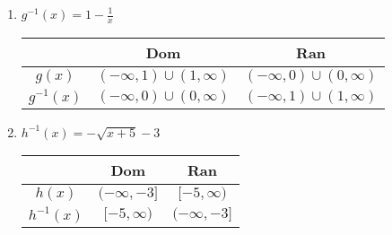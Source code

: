 \begin{enumerate}
     \item $g^{-1}(x) = 1 - \frac{1}{x}$  \newline\\
\begin{tabular}{c|c|c}
            &   Dom             &   Ran \\  \hline
    $g(x)$  &   $(-\infty,1)\cup(1,\infty)$    &   $(-\infty,0)\cup(0,\infty)$   \\  \hline
    $g^{-1}(x)$ &   $(-\infty,0)\cup(0,\infty)$   &   $(-\infty,1)\cup(1,\infty)$    \\
\end{tabular}

\item $h^{-1}(x) = -\sqrt{x+5}-3$ \newline\\ 
\begin{tabular}{c|c|c}
            &   Dom             &   Ran \\  \hline
    $h(x)$  &   $(-\infty,-3]$    &   $[-5,\infty)$   \\  \hline
    $h^{-1}(x)$ &   $[-5,\infty)$   &   $(-\infty,-3]$    \\
\end{tabular}
\end{enumerate}